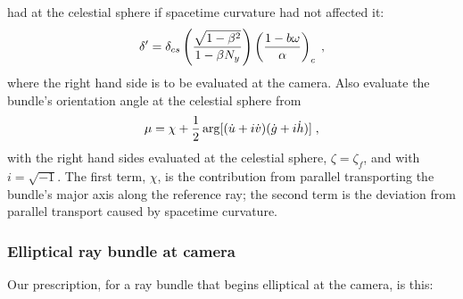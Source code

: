 \documentclass[12pt]{iopart}
\begin{document}
\begin{enumerate}
had at the celestial sphere if
spacetime curvature had not affected it:
\begin{equation}
 \delta' = \delta_{cs}
 \left({\sqrt{1-\beta^2} \over 1-\beta N_y } \right)
\left({1-b\omega \over \alpha}\right)_c\;,
\label{eq:deltaprime}
\end{equation}
where the right hand side is to be evaluated at the camera.
Also evaluate the bundle's orientation angle at the celestial sphere from
\begin{equation}
\mu = \chi +{1\over2}\arg[(\dot u+i\dot v)(\dot g + i \dot h)]\;,
\label{eq:mu}
\end{equation}
with the right hand sides evaluated at the celestial sphere, $\zeta=\zeta_f$,
and with $i = \sqrt{-1}$.  The first term, $\chi$, is the contribution from parallel
transporting the bundle's major axis along the reference ray; the second term
is the deviation from parallel transport caused by spacetime curvature.

\end{enumerate}

\subsubsection{Elliptical ray bundle at camera}

Our prescription, for a ray bundle that begins elliptical at the camera, is this:
\end{document}
